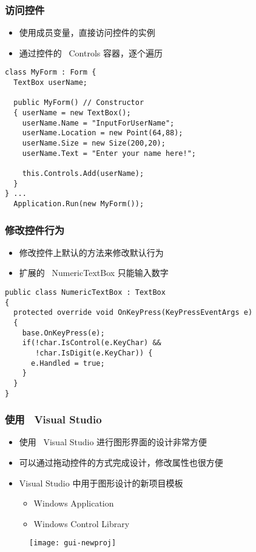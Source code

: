 \begin{frame}[fragile]
\frametitle{访问控件}
\begin{itemize}
\item 使用成员变量，直接访问控件的实例
\item 通过控件的 ~Controls 容器，逐个遍历
\end{itemize}
\begin{lstlisting}
class MyForm : Form {
  TextBox userName;
  
  public MyForm() // Constructor
  { userName = new TextBox();
    userName.Name = "InputForUserName";
    userName.Location = new Point(64,88);
    userName.Size = new Size(200,20);
    userName.Text = "Enter your name here!";

    this.Controls.Add(userName);
  }
} ...
  Application.Run(new MyForm());
\end{lstlisting}
\end{frame}

\begin{frame}[fragile]
\frametitle{修改控件行为}
\begin{itemize}
\item 修改控件上默认的方法来修改默认行为
\item 扩展的 ~NumericTextBox 只能输入数字
\end{itemize}
\begin{lstlisting}
public class NumericTextBox : TextBox
{
  protected override void OnKeyPress(KeyPressEventArgs e)
  {
    base.OnKeyPress(e);
    if(!char.IsControl(e.KeyChar) && 
       !char.IsDigit(e.KeyChar)) {
      e.Handled = true;
    }
  }
}
\end{lstlisting}
\end{frame}

\begin{frame}
\frametitle{使用~ Visual Studio}
\begin{itemize}
\item 使用 ~Visual Studio 进行图形界面的设计非常方便
\item 可以通过拖动控件的方式完成设计，修改属性也很方便
\item Visual Studio 中用于图形设计的新项目模板
\begin{itemize}
\item Windows Application
\item Windows Control Library
\end{itemize}
\end{itemize}
\begin{figure}[htbp]
  \centering
  \texttt{[image: gui-newproj]}
\end{figure}
\end{frame}

